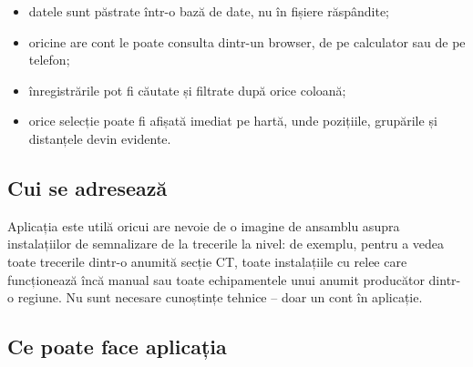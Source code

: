 \documentclass[11pt,a4paper]{article}
\begin{document}
\begin{itemize}
  \item datele sunt păstrate într-o bază de date, nu în fișiere răspândite;
  \item oricine are cont le poate consulta dintr-un browser, de pe calculator
        sau de pe telefon;
  \item înregistrările pot fi căutate și filtrate după orice coloană;
  \item orice selecție poate fi afișată imediat pe hartă, unde pozițiile,
        grupările și distanțele devin evidente.
\end{itemize}

\subsection{Cui se adresează}

Aplicația este utilă oricui are nevoie de o imagine de ansamblu asupra
instalațiilor de semnalizare de la trecerile la nivel: de exemplu, pentru a
vedea toate trecerile dintr-o anumită secție CT, toate instalațiile cu relee
care funcționează încă manual sau toate echipamentele unui anumit producător
dintr-o regiune. Nu sunt necesare cunoștințe tehnice -- doar un cont în
aplicație.

\subsection{Ce poate face aplicația}
\end{document}
